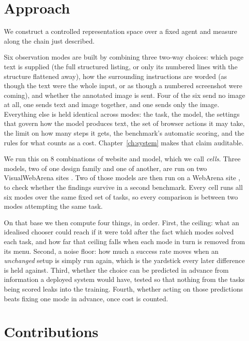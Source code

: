 \FloatBarrier
\section{Approach}
\label{sec:approach}

We construct a controlled representation space over a fixed agent and measure
along the chain just described.

Six observation modes are built by combining three two-way choices: which page
text is supplied (the full structured listing, or only its numbered lines with
the structure flattened away), how the surrounding instructions are worded (as
though the text were the whole input, or as though a numbered screenshot were
coming), and whether the annotated image is sent. Four of the six send no image at all, one sends text and image
together, and one sends only the image. Everything else is held identical
across modes: the task, the model, the settings that govern how the model
produces text, the set of browser actions it may take, the limit on how many
steps it gets, the benchmark's automatic scoring, and the rules for what
counts as a cost. Chapter~\ref{ch:system} makes that claim auditable.

We run this on 8 combinations of website and model, which we call
\emph{cells}. Three models, two of one design family and one of another,
are run on two VisualWebArena sites \citep{koh2024visualwebarena}. Two of
those models are then run on a WebArena site \citep{zhou2024webarena}, to
check whether the findings survive in a second benchmark. Every cell runs all six
modes over the same fixed set of tasks, so every comparison is between two
modes attempting the same task.

On that base we then compute four things, in order. First, the ceiling: what
an idealised chooser could reach if it were told after the fact which modes
solved each task, and how far that ceiling falls when each mode in turn is
removed from its menu. Second, a noise floor: how much a success rate moves
when an \emph{unchanged} setup is simply run again, which is the yardstick
every later difference is held against. Third, whether the choice can be
predicted in advance from information a deployed system would have, tested so
that nothing from the tasks being scored leaks into the training. Fourth,
whether acting on those predictions beats fixing one mode in advance, once
cost is counted.

\FloatBarrier
\section{Contributions}
\label{sec:contributions}

